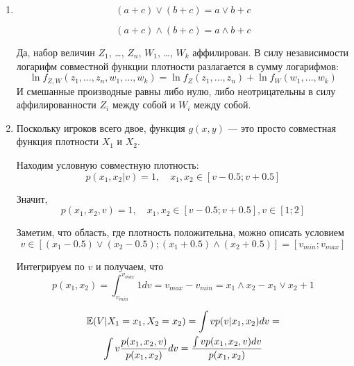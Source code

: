 \begin{enumerate}


\item
\begin{equation}
(a+c)\vee (b+c)=a\vee b +c
\end{equation}

\begin{equation}
(a+c)\wedge (b+c)=a\wedge b +c
\end{equation}

Да, набор величин $ Z_{1} $, \ldots , $ Z_{n} $, $ W_{1} $, \ldots , $ W_{k} $ аффилирован. В силу независимости логарифм совместной функции плотности разлагается в сумму логарифмов: 
\begin{equation}
\ln f_{Z,W}(z_{1},\ldots ,z_{n},w_{1},\ldots ,w_{k})= \ln f_{Z}(z_{1},\ldots ,z_{n})+\ln f_{W}(w_{1},\ldots ,w_{k})
\end{equation}
И смешанные производные равны либо нулю, либо неотрицательны в силу аффилированности $ Z_{i} $ между собой и $ W_{i} $ между собой.

\item  Поскольку игроков всего двое, функция $ g(x,y)$ — это просто совместная функция плотности $ X_{1} $ и $ X_{2} $.

Находим условную совместную плотность:
\begin{equation}
p(x_{1},x_{2}|v)=1, \quad x_{1},x_{2}\in [v-0.5;v+0.5]
\end{equation}

Значит,
\begin{equation}
p(x_{1},x_{2},v)=1, \quad x_{1},x_{2}\in [v-0.5;v+0.5],v\in [1;2]
\end{equation}

Заметим, что область, где плотность положительна, можно описать условием
\begin{equation}
v\in [(x_{1}-0.5)\vee (x_{2}-0.5); (x_{1}+0.5)\wedge (x_{2}+0.5)]=[v_{min};v_{max}]
\end{equation}

Интегрируем по $ v $ и получаем, что
\begin{equation}
p(x_{1},x_{2})=\int_{v_{min}}^{v_{max}} 1 dv= v_{max}-v_{min}=x_{1}\wedge x_{2}-x_{1}\vee x_{2}+1
\end{equation}

\begin{multline}
\operatorname{\mathbb{E}}(V|X_{1}=x_{1}, X_{2}=x_{2})=\int v p(v|x_{1},x_{2})dv=\\
\int v \frac{p(x_{1},x_{2},v)}{p(x_{1},x_{2})} dv=\frac{\int v p(x_{1},x_{2},v) dv }{p(x_{1},x_{2})}
\end{multline}


\end{enumerate}
